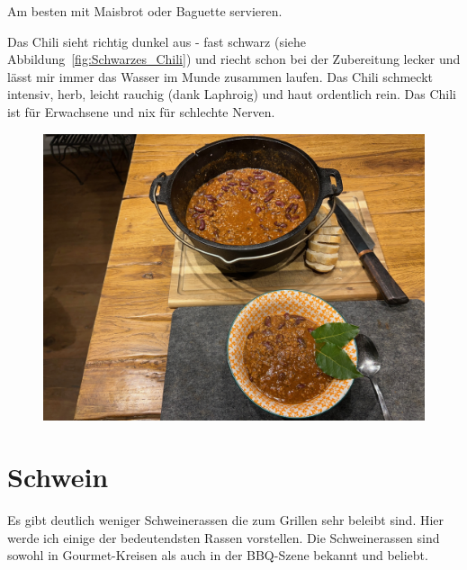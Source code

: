 Am besten mit Maisbrot oder Baguette servieren.

Das Chili sieht richtig dunkel aus - fast schwarz (siehe 
Abbildung~\vref{fig:Schwarzes_Chili}) und riecht schon bei der Zubereitung 
lecker und lässt mir immer das Wasser im Munde zusammen laufen. Das Chili 
schmeckt intensiv, herb, leicht rauchig (dank Laphroig) und haut ordentlich 
rein. Das Chili ist für Erwachsene und nix für schlechte Nerven.
\newpage

\begin{figure}[htbp]
	\centering
	\begin{minipage}{1\textwidth}
		\centering
		\includegraphics[width=.9\linewidth]{pics/Schwarzes Chili}
		\label{fig:Schwarzes_Chili}
	\end{minipage}
\end{figure}
\newpage

\section{Schwein}

Es gibt deutlich weniger Schweinerassen die zum Grillen sehr beleibt 
sind. Hier werde ich einige der bedeutendsten Rassen vorstellen. Die 
Schweinerassen  sind sowohl in Gourmet-Kreisen als auch in der 
BBQ-Szene bekannt und beliebt.

